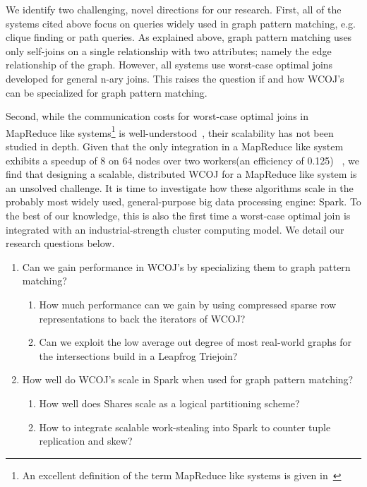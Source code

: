 We identify two challenging, novel directions for our research.
First, all of the systems cited above focus on queries widely used in graph pattern matching, e.g. clique finding or path queries.
As explained above, graph pattern matching uses only self-joins on a single relationship with two attributes;
namely the edge relationship of the graph.
However, all systems use worst-case optimal joins developed for general n-ary joins.
This raises the question if and how \textsc{WCOJ}'s can be specialized for graph pattern matching.

Second, while the communication costs for worst-case optimal joins in MapReduce like systems\footnote{
An excellent definition of the term MapReduce like systems is given in~\cite{shares}}
is well-understood~\cite{shares,shares-skew,shares-proof,shares-skew-proof},
their scalability has not been studied in depth.
Given that the only integration in a MapReduce like system exhibits a speedup of 8 on 64 nodes over two workers(an efficiency of 0.125)
~\cite{myria-detailed},
we find that designing a scalable, distributed \textsc{WCOJ} for a MapReduce like system is an unsolved challenge.
It is time to investigate how these algorithms scale in the probably most widely used, general-purpose big data processing engine: Spark.
To the best of our knowledge, this is also the first time a worst-case optimal join is integrated with an industrial-strength cluster
computing model.
We detail our research questions below.
\begin{enumerate}
    \item Can we gain performance in \textsc{WCOJ}’s by specializing them to graph pattern matching?
    \begin{enumerate}
        \item How much performance can we gain by using compressed sparse row representations to back the iterators of \textsc{WCOJ}?
        \item Can we exploit the low average out degree of most real-world graphs for the intersections build in a Leapfrog Triejoin?
    \end{enumerate}
    \item How well do \textsc{WCOJ}’s scale in Spark when used for graph pattern matching?
    \begin{enumerate}
        \item How well does Shares scale as a logical partitioning scheme?
        \item How to integrate scalable work-stealing into Spark to counter tuple replication and skew?
    \end{enumerate}
\end{enumerate}


